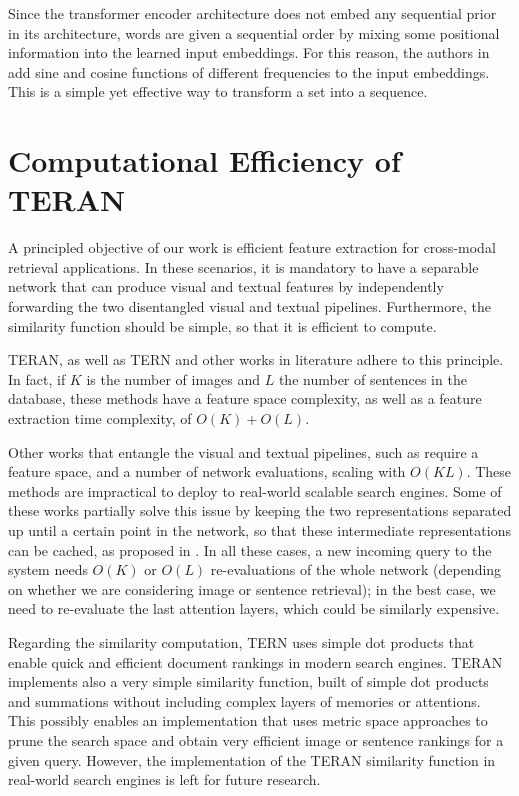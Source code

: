 \documentclass[acmsmall]{acmart}
\newcommand{\majorrevised}[1]{#1}
\begin{document}
Since the transformer encoder architecture does not embed any sequential prior in its architecture, words are given a sequential order by mixing some positional information into the learned input embeddings. For this reason, the authors in \cite{vaswani2017transformer} add sine and cosine functions of different frequencies to the input embeddings. This is a simple yet effective way to transform a set into a sequence.

\majorrevised{
\section{Computational Efficiency of TERAN}
\label{sec:computational_efficiency}
A principled objective of our work is efficient feature extraction for cross-modal retrieval applications. In these scenarios, it is mandatory to have a separable network that can produce visual and textual features by independently forwarding the two disentangled visual and textual pipelines. Furthermore, the similarity function should be simple, so that it is efficient to compute.

TERAN, as well as TERN \cite{messina2020tern} and other works in literature \cite{wu2019learning,qu2020context,li2019} adhere to this principle. In fact, if $K$ is the number of images and $L$ the number of sentences in the database, these methods have a feature space complexity, as well as a feature extraction time complexity, of $O(K) + O(L)$.

Other works that entangle the visual and textual pipelines, such as \cite{Chen2020imram,xu2020cross,wang2019position} require a feature space, and a number of network evaluations, scaling with $O(KL)$. These methods are impractical to deploy to real-world scalable search engines. Some of these works partially solve this issue by keeping the two representations separated up until a certain point in the network, so that these intermediate representations can be cached, as proposed in \cite{macavaney2020efficient}.
In all these cases, a new incoming query to the system needs $O(K)$ or $O(L)$ re-evaluations of the whole network (depending on whether we are considering image or sentence retrieval); in the best case, we need to re-evaluate the last attention layers, which could be similarly expensive.

Regarding the similarity computation, TERN uses simple dot products that enable quick and efficient document rankings in modern search engines.
TERAN implements also a very simple similarity function, built of simple dot products and summations without including complex layers of memories or attentions. This possibly enables an implementation that uses metric space approaches to prune the search space and obtain very efficient image or sentence rankings for a given query. However, the implementation of the TERAN similarity function in real-world search engines is left for future research.
}
\end{document}
